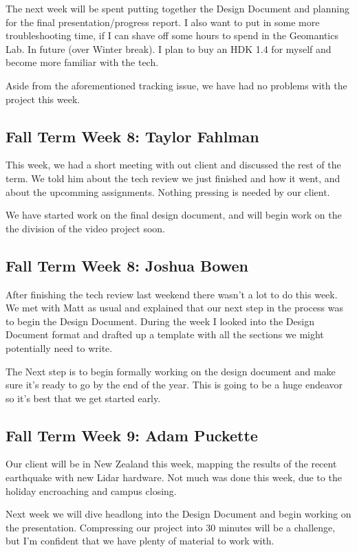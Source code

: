 \documentclass[draftclsnofoot,onecolumn]{IEEEtran}
\begin{document}
The next week will be spent putting together the Design Document and planning for the final presentation/progress report. I also want to put in some more troubleshooting time, if I can shave off some hours to spend in the Geomantics Lab. In future (over Winter break). I plan to buy an HDK 1.4 for myself and become more familiar with the tech.

Aside from the aforementioned tracking issue, we have had no problems with the project this week.

\subsection{Fall Term Week 8: Taylor Fahlman}

This week, we had a short meeting with out client and discussed the rest of the term. We told him about the tech review we just finished and how it went, and about the upcomming assignments. Nothing pressing is needed by our client.

We have started work on the final design document, and will begin work on the the division of the video project soon.

\subsection{Fall Term Week 8: Joshua Bowen}

After finishing the tech review last weekend there wasn't a lot to do this week. We met with Matt as usual and explained that our next step in the process was to begin the Design Document. During the week I looked into the Design Document format and drafted up a template with all the sections we might potentially need to write.

The Next step is to begin formally working on the design document and make sure it's ready to go by the end of the year. This is going to be a huge endeavor so it's best that we get started early.

\subsection{Fall Term Week 9: Adam Puckette}

Our client will be in New Zealand this week, mapping the results of the recent earthquake with new Lidar hardware. Not much was done this week, due to the holiday encroaching and campus closing.

Next week we will dive headlong into the Design Document and begin working on the presentation. Compressing our project into 30 minutes will be a challenge, but I'm confident that we have plenty of material to work with.
\end{document}
